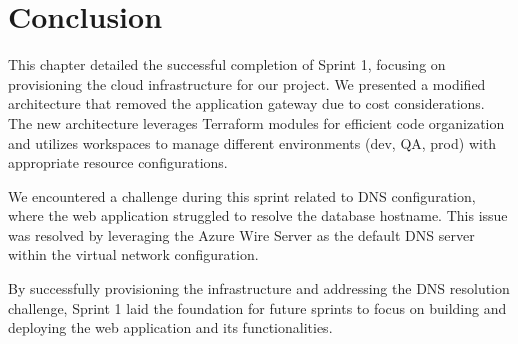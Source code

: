 \section*{Conclusion}
This chapter detailed the successful completion of Sprint 1, focusing on provisioning the cloud infrastructure for our project. We presented a modified architecture that removed the application gateway due to cost considerations. The new architecture leverages Terraform modules for efficient code organization and utilizes workspaces to manage different environments (dev, QA, prod) with appropriate resource configurations.
\par
We encountered a challenge during this sprint related to DNS configuration, where the web application struggled to resolve the database hostname. This issue was resolved by leveraging the Azure Wire Server as the default DNS server within the virtual network configuration.
\par
By successfully provisioning the infrastructure and addressing the DNS resolution challenge, Sprint 1 laid the foundation for future sprints to focus on building and deploying the web application and its functionalities.
